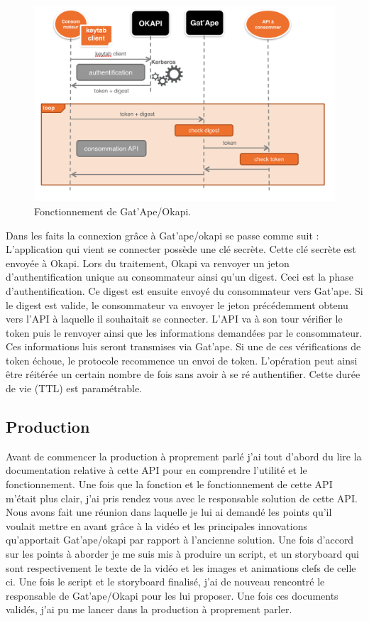 \begin{figure}[htp]
  \centering
  \includegraphics[width=15cm]{images/gao/gao1}
  \caption{Fonctionnement de Gat'Ape/Okapi.}
  \label{gatape}
\end{figure}


Dans les faits la connexion grâce à Gat'ape/okapi se passe comme suit : 
L'application qui vient se connecter possède une clé secrète. Cette clé secrète est envoyée à Okapi. Lors du traitement, Okapi va renvoyer un jeton d'authentification unique au consommateur ainsi qu'un digest. Ceci est la phase d'authentification.  Ce digest est ensuite envoyé du consommateur vers Gat'ape. Si le digest est valide, le consommateur va envoyer le jeton précédemment obtenu vers l'API à laquelle il souhaitait se connecter. L'API va à son tour vérifier le token puis le renvoyer ainsi que les informations demandées par le consommateur. Ces informations luis seront transmises via Gat'ape. Si une de ces vérifications de token échoue, le protocole recommence un envoi de token. L'opération peut ainsi être réitérée un certain nombre de fois sans avoir à se ré authentifier. Cette durée de vie (TTL) est paramétrable.




\subsection{Production}
Avant de commencer la production à proprement parlé j'ai tout d'abord du lire la documentation relative à cette API pour en comprendre l'utilité et le fonctionnement. Une fois que la fonction et le fonctionnement de cette API m'était plus clair, j'ai pris rendez vous avec le responsable solution de cette API. Nous avons fait une réunion dans laquelle je lui ai demandé les points qu'il voulait mettre en avant grâce à la vidéo et les principales innovations qu'apportait Gat'ape/okapi par rapport à l'ancienne solution. Une fois d'accord sur les points à aborder je me suis mis à produire un script, et un storyboard qui sont respectivement le texte de la vidéo et les images et animations clefs de celle ci. Une fois le script et le storyboard finalisé, j'ai de nouveau rencontré le responsable de Gat'ape/Okapi pour les lui proposer. Une fois ces documents validés, j'ai pu me lancer dans la production à proprement parler. \\

